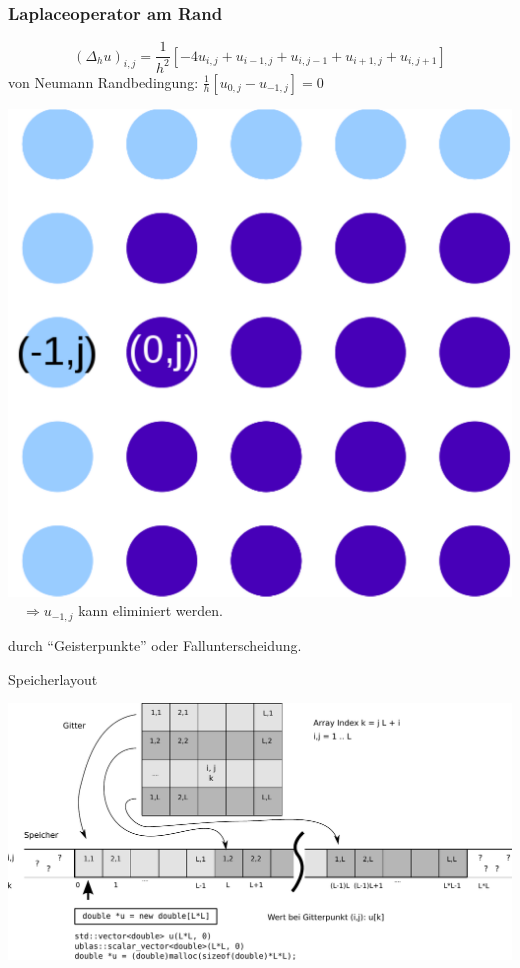 \documentclass[10pt]{beamer}
\begin{document}
\frame
{
\frametitle{Laplaceoperator am Rand}

\begin{equation}
(\Delta_h u)_{i,j} = \frac{1}{h^2} \left[ -4 u_{i,j} + u_{i-1,j} + u_{i,j-1} + u_{i+1,j} + u_{i,j+1} \right]\nonumber
\end{equation}
von Neumann Randbedingung: $\frac{1}{h} \left[u_{0,j} - u_{-1,j}\right]=0$

\begin{center}
 \includegraphics[scale=0.25]{img/Gitter2.pdf} $\quad\Rightarrow u_{-1,j}$ kann eliminiert werden.
\end{center}
durch ``Geisterpunkte'' oder Fallunterscheidung.
}


\begin{frame}{Speicherlayout}
\begin{center}
\includegraphics[scale=0.5]{img/speicher2.pdf}
\end{center}
\end{frame}
\end{document}
